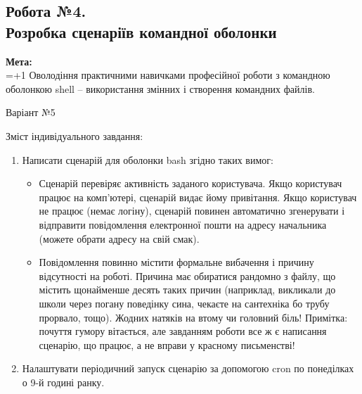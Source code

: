 \documentclass[a4paper,12pt]{article}
\begin{document}
\newpage
    \begin{center}
        \section*{\bfseries{Робота №4.\\
        Розробка сценаріїв командної оболонки}}
    \end{center}
    \textbf{Мета:} \\
    \hangindent=1.5cm 
    \hangafter=+1 \noindent
    Оволодіння практичними навичками професійної
    роботи з командною оболонкою shell – використання
    змінних і створення командних файлів. \\
    \begin{center}
        \Large{Варіант №5}
    \end{center}
    Зміст індивідуального завдання:
    \begin{enumerate}
        \item Написати сценарій для оболонки bash згідно таких вимог:
        \begin{itemize}
            \item Сценарій перевіряє активність заданого користувача. Якщо користувач працює на комп’ютері, сценарій видає йому привітання. Якщо користувач не працює (немає
            логіну), сценарій повинен автоматично згенерувати і відправити повідомлення електронної пошти на адресу начальника (можете обрати адресу на свій смак).
            \item Повідомлення повинно містити формальне вибачення і причину відсутності на роботі. Причина має обиратися рандомно з файлу, що містить щонайменше десять таких
            причин (наприклад, викликали до школи через погану поведінку сина, чекаєте на сантехніка бо трубу прорвало, тощо). Жодних натяків на втому чи головний біль! 
            Примітка: почуття гумору вітається, але завданням роботи все ж є написання сценарію, що працює, а не вправи у красному письменстві!
        \end{itemize}
        \item Налаштувати періодичний запуск сценарію за допомогою cron по понеділках о 9-й годині ранку.
    \end{enumerate}
\end{document}
